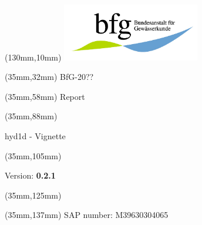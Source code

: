 \begin{titlepage}
    \begin{textblock*}{50mm}(130mm,10mm)
    \includegraphics[width=6cm]{latex/bfg_logo.jpg} %
    \end{textblock*}

    \begin{textblock*}{150mm}(35mm,32mm)
    \huge\noindent
    BfG-20??
    \end{textblock*}

    \begin{textblock*}{150mm}(35mm,58mm)
    \fontsize{30}{35}\selectfont\noindent
    Report
    \end{textblock*}

    \begin{textblock*}{150mm}(35mm,88mm)
    \fontsize{20}{25}\selectfont\noindent
    \begin{center}
    hyd1d - Vignette
    \end{center}
    \end{textblock*}

    \begin{textblock*}{150mm}(35mm,105mm)
    \fontsize{15}{17}\selectfont\noindent
    \begin{center}
    Version: \textbf{0.2.1}
    \end{center}
    \end{textblock*}

    \begin{textblock*}{150mm}(35mm,125mm)
    \fontsize{15}{17}\selectfont\noindent
    \mytoday
    \end{textblock*}


    \begin{textblock*}{150mm}(35mm,137mm)
    \fontsize{15}{17}\selectfont\noindent
    SAP number: M39630304065
    \end{textblock*}


\end{titlepage}
